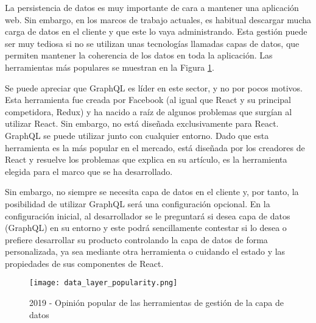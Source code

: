 La persistencia de datos es muy importante de cara a mantener una aplicación web. Sin embargo, en los marcos de trabajo actuales, es habitual descargar mucha carga de datos en el cliente y que este lo vaya administrando. Esta gestión puede ser muy tediosa si no se utilizan unas tecnologías llamadas capas de datos, que permiten mantener la coherencia de los datos en toda la aplicación. Las herramientas más populares se muestran en la Figura \cref{fig:stjs2019:datalayer}. 

Se puede apreciar que GraphQL es líder en este sector, y no por pocos motivos. Esta herramienta fue creada por Facebook (al igual que React y su principal competidora, Redux) y ha nacido a raíz de algunos problemas que surgían al utilizar React. Sin embargo, no está diseñada exclusivamente para React. GraphQL se puede utilizar junto con cualquier entorno. Dado que esta herramienta es la más popular en el mercado, está diseñada por los creadores de React y resuelve los problemas que explica \citet{RDXVGQL} en su artículo, es la herramienta elegida para el marco que se ha desarrollado.

Sin embargo, no siempre se necesita capa de datos en el cliente y, por tanto, la posibilidad de utilizar GraphQL será una configuración opcional. En la configuración inicial, al desarrollador se le preguntará si desea capa de datos (GraphQL) en su entorno y este podrá sencillamente contestar si lo desea o prefiere desarrollar su producto controlando la capa de datos de forma personalizada, ya sea mediante otra herramienta o cuidando el estado y las propiedades de sus componentes de React.

\begin{figure}
	\centering
	\texttt{[image: data\_layer\_popularity.png]}
	\caption{2019 - Opinión popular de las herramientas de gestión de la capa de datos}
	\label{fig:stjs2019:datalayer}
\end{figure}

